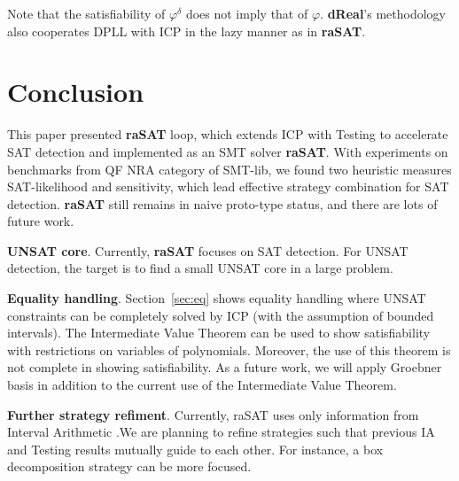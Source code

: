 \documentclass[runningheads,a4paper,oribibl]{llncs}
\begin{document}
{Note that the satisfiability of $\varphi^\delta$ does not imply that of $\varphi$. 
\textbf{dReal}'s methodology~\cite{Gao:2012:9DP:2352896.2352921} also cooperates DPLL with ICP 
in the lazy manner as in \textbf{raSAT}.

\medskip 
}

%
\section{Conclusion} \label{sec:conclusion and Future Work}


This paper presented {\bf raSAT} loop, which extends ICP with Testing to accelerate
SAT detection and implemented as an SMT solver \textbf{raSAT}. With experiments on benchmarks from QF NRA category of SMT-lib, we found two heuristic measures SAT-likelihood and sensitivity, which lead effective strategy combination for SAT detection.
{\bf raSAT} still remains in naive proto-type status, and 
there are lots of future work. 

\medskip \noindent 
{\bf UNSAT core}. Currently, \textbf{raSAT} focuses on SAT detection. For
UNSAT detection, the target is to find a small UNSAT core in a large problem.


\medskip \noindent 
{\bf Equality handling}. 
Section~\ref{sec:eq} shows equality handling where UNSAT constraints can be completely solved by ICP (with the assumption of bounded intervals). The Intermediate Value Theorem can be used to show satisfiability with restrictions on variables of polynomials. Moreover, the use of this theorem is not complete in showing satisfiability. As a future work, we will apply Groebner basis in addition to the current use of the Intermediate Value Theorem.

\medskip \noindent 
{\bf Further strategy refiment}. 
Currently, raSAT uses only information from Interval Arithmetic .We are planning to refine strategies such that previous
IA and Testing results mutually guide to each other. For instance, a box decomposition strategy can be more focused.
\end{document}
